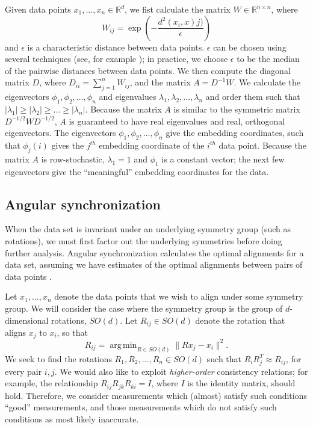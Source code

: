 \documentclass[10pt]{article}
\DeclareMathOperator*{\argmin}{arg\,min}
\begin{document}
Given data points $x_1, \dots, x_n \in \mathbb{R}^d$, we fist calculate the matrix $W \in \mathbb{R}^{n \times n}$, where 
\begin{equation}
W_{ij} = \exp \left( -\frac{d^2(x_i, x)j)}{\epsilon} \right)
\end{equation}
and $\epsilon$ is a characteristic distance between data points.
%
$\epsilon$ can be chosen using several techniques (see, for example \cite{coifman2008graph}); in practice, we choose $\epsilon$ to be the median of the pairwise distances between data points.
%
We then compute the diagonal matrix $D$, where $D_{ii} = \sum_{j=1}^{n} W_{ij}$, and the matrix $A = D^{-1} W$. 
%
We calculate the eigenvectors $\phi_1, \phi_2, \dots, \phi_n$ and eigenvalues $\lambda_1, \lambda_2, \dots, \lambda_n$ and order them such that $|\lambda_1| \ge |\lambda_2| \ge \dots \ge |\lambda_n|$. 
%
Because the matrix $A$ is similar to the symmetric matrix $D^{-1/2} W D^{-1/2}$, $A$ is guaranteed to have real eigenvalues and real, orthogonal eigenvectors. 
%
The eigenvectors $\phi_1, \phi_2, \dots, \phi_n$ give the embedding coordinates, such that $\phi_j(i)$ gives the $j^{th}$ embedding coordinate of the $i^{th}$ data point. 
%
Because the matrix $A$ is row-stochastic, $\lambda_1=1$ and $\phi_1$ is a constant vector; the next few eigenvectors give the ``meaningful'' embedding coordinates for the data. 

\subsection*{Angular synchronization}

When the data set is invariant under an underlying symmetry group (such as rotations), we must first factor out the underlying symmetries before doing further analysis.
%
Angular synchronization calculates the optimal alignments for a data set, assuming we have estimates of the optimal alignments between pairs of data points \cite{singer2011angular}. 

Let $x_1, \dots, x_n$ denote the data points that we wish to align under some symmetry group.
%
We will consider the case where the symmetry group is the group of $d$-dimensional rotations, $SO(d)$. 
%
Let $R_{ij} \in SO(d)$ denote the rotation that aligns $x_j$ to $x_i$, so that
\begin{equation}
R_{ij} = \argmin_{R \in SO(d)} \|Rx_j - x_i \|^2.
\end{equation}
%
We seek to find the rotations $R_1, R_2, \dots, R_n \in SO(d)$ such that $R_i R_j^T \approx R_{ij}$, for every pair $i, j$. 
%
We would also like to exploit {\em higher-order} consistency relations;
for example, the relationship $R_{ij} R_{jk} R_{ki} = I$, where $I$ is the identity matrix, should hold.
%
Therefore, we consider measurements which (almost) satisfy such conditions ``good'' measurements, and those measurements which do not satisfy such conditions as most likely inaccurate.
\end{document}
